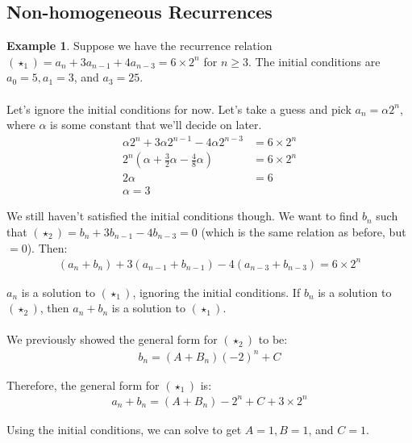 \documentclass[]{article}
\theoremstyle{definition}
\newtheorem{ex}{Example}[section]
\begin{document}
		\subsection{Non-homogeneous Recurrences}
			\begin{ex}
				Suppose we have the recurrence relation $(\star_1) = a_n + 3a_{n - 1} + 4a_{n - 3} = 6 \times 2^n$ for $n \ge 3$. The initial conditions are $a_0 = 5, a_1 = 3$, and $a_3 = 25$.
				\\ \\
				Let's ignore the initial conditions for now. Let's take a guess and pick $a_n = \alpha 2^n$, where $\alpha$ is some constant that we'll decide on later.
				\begin{align*}
					\alpha 2^n + 3 \alpha 2^{n - 1} - 4 \alpha 2^{n - 3} &= 6 \times 2^n \\
					2^n(\alpha + \frac{3}{2} \alpha - \frac{4}{8} \alpha) &= 6 \times 2^n \\
					2 \alpha &= 6 \\
					\alpha = 3
				\end{align*}

				We still haven't satisfied the initial conditions though. We want to find $b_n$ such that $(\star_2) = b_n + 3b_{n - 1} - 4b_{n - 3} = 0$ (which is the same relation as before, but $= 0$). Then:
				\begin{align*}
					(a_n + b_n) + 3(a_{n - 1} + b_{n - 1}) - 4(a_{n - 3} + b_{n - 3}) = 6 \times 2^n
				\end{align*}

				$a_n$ is a solution to $(\star_1)$, ignoring the initial conditions. If $b_n$ is a solution to $(\star_2)$, then $a_n + b_n$ is a solution to $(\star_1)$.
				\\ \\
				We previously showed the general form for $(\star_2)$ to be:
				\begin{align*}
					b_n = (A + B_n)(-2)^n + C
				\end{align*}

				Therefore, the general form for $(\star_1)$ is:
				\begin{align*}
					a_n + b_n = (A + B_n) - 2^n + C + 3 \times 2^n
				\end{align*}

				Using the initial conditions, we can solve to get $A = 1, B = 1$, and $C = 1$. \\
			\end{ex}
\end{document}

